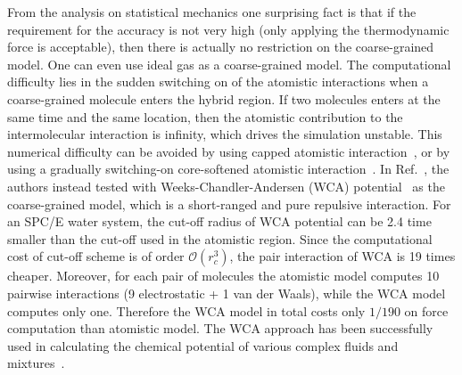 \documentclass[epjST]{svjour}
\newcommand{\vect}[1]{\textbf{\textit{#1}}}
\newcommand{\mo}[0]{\mathcal {O}}
\newcommand{\AT}[0]{\textrm{AT}}
\newcommand{\HY}[0]{\textrm{HY}}
\begin{document}
From the analysis on statistical mechanics one surprising fact is that if the
requirement for the accuracy is not very high (only applying the
thermodynamic force is acceptable), then there is actually no
restriction on the coarse-grained model. One can even use ideal gas as
a coarse-grained model.  The computational difficulty lies in the
sudden switching on of the atomistic interactions when a coarse-grained
molecule enters the hybrid region. If two molecules enters at
the same time and the same location, then the atomistic contribution
to the intermolecular interaction
is infinity, which drives the simulation
unstable. This numerical difficulty can be avoided by using capped
atomistic interaction~\cite{praprotnik2005adaptive}, or by using a
gradually switching-on core-softened atomistic
interaction~\cite{heyes2010thermodynamic}.
In Ref.~\cite{wang2013grand}, the authors instead tested with
Weeks-Chandler-Andersen (WCA) potential~\cite{weeks1971role} as the
coarse-grained model, which is a short-ranged and pure repulsive
interaction.  For an SPC/E water system, the cut-off radius of WCA potential
can be 2.4 time smaller than the cut-off used in the atomistic
region. Since the computational cost of cut-off scheme is of order $\mo(r_c^3)$,
the pair interaction of WCA
is 19 times cheaper. Moreover, for each pair of molecules the atomistic model computes
10 pairwise interactions (9 electrostatic + 1 van der Waals), while the
WCA model computes only one. Therefore the WCA model in total costs only $1/190$ 
on force computation than atomistic model.
The WCA approach has been successfully used in calculating the
chemical potential of various complex fluids and mixtures~\cite{agarwal2014chemical}.


\end{document}
